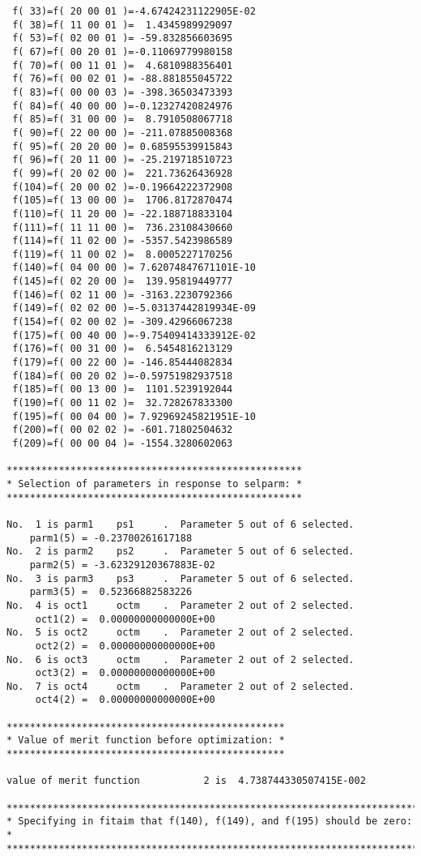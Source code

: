 \begin{footnotesize}
\begin{verbatim}
 f( 33)=f( 20 00 01 )=-4.67424231122905E-02
 f( 38)=f( 11 00 01 )=  1.4345989929097
 f( 53)=f( 02 00 01 )= -59.832856603695
 f( 67)=f( 00 20 01 )=-0.11069779980158
 f( 70)=f( 00 11 01 )=  4.6810988356401
 f( 76)=f( 00 02 01 )= -88.881855045722
 f( 83)=f( 00 00 03 )= -398.36503473393
 f( 84)=f( 40 00 00 )=-0.12327420824976
 f( 85)=f( 31 00 00 )=  8.7910508067718
 f( 90)=f( 22 00 00 )= -211.07885008368
 f( 95)=f( 20 20 00 )= 0.68595539915843
 f( 96)=f( 20 11 00 )= -25.219718510723
 f( 99)=f( 20 02 00 )=  221.73626436928
 f(104)=f( 20 00 02 )=-0.19664222372908
 f(105)=f( 13 00 00 )=  1706.8172870474
 f(110)=f( 11 20 00 )= -22.188718833104
 f(111)=f( 11 11 00 )=  736.23108430660
 f(114)=f( 11 02 00 )= -5357.5423986589
 f(119)=f( 11 00 02 )=  8.0005227170256
 f(140)=f( 04 00 00 )= 7.62074847671101E-10
 f(145)=f( 02 20 00 )=  139.95819449777
 f(146)=f( 02 11 00 )= -3163.2230792366
 f(149)=f( 02 02 00 )=-5.03137442819934E-09
 f(154)=f( 02 00 02 )= -309.42966067238
 f(175)=f( 00 40 00 )=-9.75409414333912E-02
 f(176)=f( 00 31 00 )=  6.5454816213129
 f(179)=f( 00 22 00 )= -146.85444082834
 f(184)=f( 00 20 02 )=-0.59751982937518
 f(185)=f( 00 13 00 )=  1101.5239192044
 f(190)=f( 00 11 02 )=  32.728267833300
 f(195)=f( 00 04 00 )= 7.92969245821951E-10
 f(200)=f( 00 02 02 )= -601.71802504632
 f(209)=f( 00 00 04 )= -1554.3280602063

***************************************************
* Selection of parameters in response to selparm: *
***************************************************

No.  1 is parm1    ps1     .  Parameter 5 out of 6 selected.
    parm1(5) = -0.23700261617188
No.  2 is parm2    ps2     .  Parameter 5 out of 6 selected.
    parm2(5) = -3.62329120367883E-02
No.  3 is parm3    ps3     .  Parameter 5 out of 6 selected.
    parm3(5) =  0.52366882583226
No.  4 is oct1     octm    .  Parameter 2 out of 2 selected.
     oct1(2) =  0.00000000000000E+00
No.  5 is oct2     octm    .  Parameter 2 out of 2 selected.
     oct2(2) =  0.00000000000000E+00
No.  6 is oct3     octm    .  Parameter 2 out of 2 selected.
     oct3(2) =  0.00000000000000E+00
No.  7 is oct4     octm    .  Parameter 2 out of 2 selected.
     oct4(2) =  0.00000000000000E+00

************************************************
* Value of merit function before optimization: *
************************************************

value of merit function           2 is  4.738744330507415E-002

************************************************************************
* Specifying in fitaim that f(140), f(149), and f(195) should be zero: *
************************************************************************


\end{verbatim}
\end{footnotesize}
